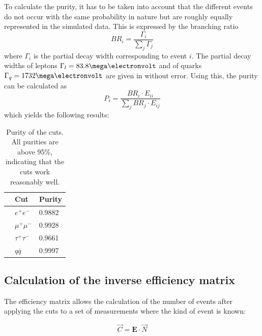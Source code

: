 To calculate the purity, it has to be taken into account that the different events do not occur with the same probability in nature but are roughly equally represented in the simulated data. This is expressed by the branching ratio
\begin{equation}
BR_i=\frac{\Gamma_i}{\sum_{j}\Gamma_{j}}
\end{equation}
where $\Gamma_i$ is the partial decay width corresponding to event $i$. The partial decay widths of leptons $\Gamma_l=\unit{83.8}{\mega\electronvolt}$ and of quarks $\Gamma_q=\unit{1732}{\mega\electronvolt}$ are given in \cite{staatsex} without error.
Using this, the purity can be calculated as
\begin{equation}
P_i=\frac{BR_i\cdot E_{ii}}{\sum_{j}BR_j\cdot E_{ij}}
\end{equation}
which yields the following results:

\begin{table}[H]\centering
	\begin{tabular}{@{}lll@{}}
		\toprule
		&Cut&Purity\\
		\midrule
		&$e^+e^-$&0.9882\\
		&$\mu^+\mu^-$&0.9928\\
		&$\tau^+\tau^-$&0.9661\\
		&$q\overline{q}$&0.9997\\
		\bottomrule
	\end{tabular}
	\caption[Purity of the cuts]{Purity of the cuts. All purities are above 95\%, indicating that the cuts work reasonably well.}
	\label{tb:purity}
\end{table}

\subsection{Calculation of the inverse efficiency matrix}
The efficiency matrix allows the calculation of the number of events after applying the cuts to a set of measurements where the kind of event is known:

\begin{equation}
\vec{C}=\boldsymbol{E}\cdot\vec{N}
\end{equation} 

